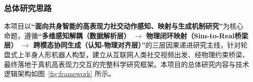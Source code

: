 






\subsubsection{总体研究思路}

本项目以\textbf{``面向共身智能的高表现力社交动作感知、映射与生成机制研究''}为核心命题，遵循\textbf{``多维感知解耦（数据解析层） $\rightarrow$ 物理闭环映射（Sim-to-Real桥梁层） $\rightarrow$ 跨模态协同生成（认知-物理对齐层）''}的三层因果递进研究主线，针对轮盘式上半身人形机器人构型，建立从互联网人类社交视频出发、经物理约束桥梁、最终落地于真机高表现力交互的完整科学研究框架。本项目的总体研究内容与技术逻辑架构如图~\ref{fig:framework} 所示。

